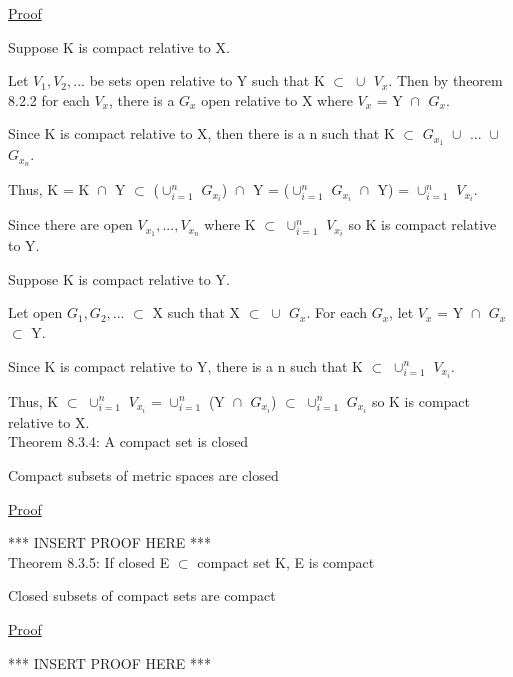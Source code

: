 { \color{magenta} \underline{Proof} } 

	Suppose K is compact relative to X.

	Let $V_1, V_2, ...$ be sets open relative to Y such that
	K $\subset$ $\cup_{}^{}$ $V_x$.
	Then by {\color{red} theorem 8.2.2} for each $V_x$, there is a
	$G_x$ open relative to X where $V_x$ = Y $\cap_{}^{}$ $G_x$.

	Since K is compact relative to X, then there is a n such that
	K $\subset$ $G_{x_1}$ $\cup_{}^{}$ ... $\cup_{}^{}$ $G_{x_n}$.

	Thus, K = K $\cap_{}^{}$ Y $\subset$ ($\cup_{i=1}^{n}$ $G_{x_i}$) $\cap_{}^{}$ Y
	= ($\cup_{i=1}^{n}$ $G_{x_i}$ $\cap_{}^{}$ Y) = $\cup_{i=1}^{n}$ $V_{x_i}$.
	
	Since there are open $V_{x_1}, ... , V_{x_n}$ where
	K $\subset$ $\cup_{i=1}^{n}$ $V_{x_i}$ so K is compact relative to Y.

	Suppose K is compact relative to Y.

	Let open $G_1, G_2, ...$ $\subset$ X such that X $\subset$ $\cup_{}^{}$ $G_x$.
	For each $G_x$, let $V_x$ = Y $\cap_{}^{}$ $G_x$ $\subset$ Y.

	Since K is compact relative to Y, there is a n such that
	K $\subset$ $\cup_{i=1}^{n}$ $V_{x_i}$.

	Thus, K $\subset$ $\cup_{i=1}^{n}$ $V_{x_i}$
	= $\cup_{i=1}^{n}$ (Y $\cap_{}^{}$ $G_{x_i}$)
	$\subset$ $\cup_{i=1}^{n}$ $G_{x_i}$ so K is compact relative to X. \\

{ \color{red} Theorem 8.3.4: A compact set is closed } 

	\begin{adjustbox}{minipage=14cm, right, vspace=0.1cm 0cm}
		Compact subsets of metric spaces are closed
	\end{adjustbox}

{ \color{magenta} \underline{Proof} } 

	*** INSERT PROOF HERE *** \\

{ \color{red} Theorem 8.3.5: If closed E $\subset$ compact set K, E is compact } 

	\begin{adjustbox}{minipage=14cm, right, vspace=0.1cm 0cm}
		Closed subsets of compact sets are compact
	\end{adjustbox}

{ \color{magenta} \underline{Proof} } 

	*** INSERT PROOF HERE *** \\

